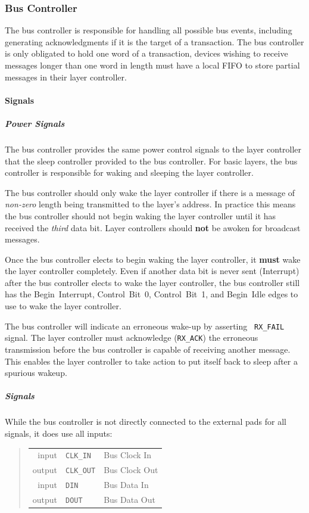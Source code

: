 \subsubsection{Bus Controller}
The bus controller is responsible for
handling all possible bus events, including generating acknowledgments if it
is the target of a transaction. The bus controller is only obligated to hold
one word of a transaction, devices wishing to receive messages longer than one
word in length must have a local FIFO to store partial messages in their layer
controller.

\paragraph{Signals}

\subparagraph{Power Signals}
The bus controller provides the same power control signals to the layer
controller that the sleep controller provided to the bus controller. For basic
layers, the bus controller is responsible for waking and sleeping the layer
controller.

The bus controller should only wake the layer controller if there is a message
of {\em non-zero} length being transmitted to the layer's address. In practice
this means the bus controller should not begin waking the layer controller
until it has received the {\em third} data bit. Layer controllers should {\bf
not} be awoken for broadcast messages.

Once the bus controller elects to begin waking the layer controller, it {\bf
must} wake the layer controller completely. Even if another data bit is never
sent (Interrupt) after the bus controller elects to wake the layer controller,
the bus controller still has the Begin~Interrupt, Control~Bit~0,
Control~Bit~1, and Begin~Idle edges to use to wake the layer controller.

The bus controller will indicate an erroneous wake-up by asserting {\tt
RX\_FAIL} signal. The layer controller must acknowledge ({\tt RX\_ACK}) the
erroneous transmission before the bus controller is capable of receiving
another message. This enables the layer controller to take action to put
itself back to sleep after a spurious wakeup.

\subparagraph{\bus Signals}
While the bus controller is not directly connected to the external pads for
all \bus signals, it does use all \bus inputs:

\begin{quote}
\begin{tabular}{r l l}
  {\sc  input} & {\tt CLK\_IN} & Bus Clock In \\
  {\sc output} & {\tt CLK\_OUT} & Bus Clock Out \\
  {\sc  input} & {\tt DIN} & Bus Data In \\
  {\sc output} & {\tt DOUT} & Bus Data Out \\
\end{tabular}
\end{quote}

